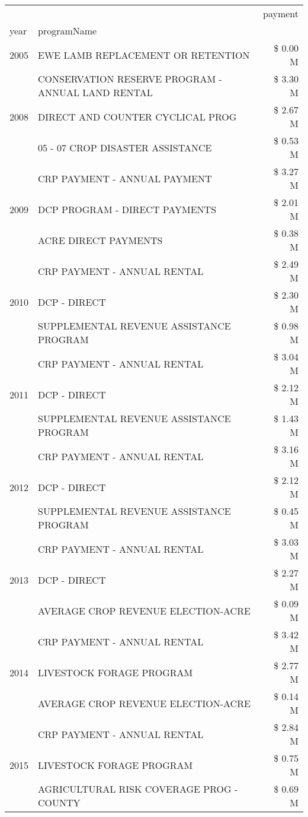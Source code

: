 \begin{tabular}{llr}
\toprule
 &  & payment \\
year & programName &  \\
\midrule
2005 & EWE LAMB REPLACEMENT OR RETENTION & \$ 0.00 M \\
\cline{1-3}
\multirow[t]{3}{*}{2008} & CONSERVATION RESERVE PROGRAM - ANNUAL LAND RENTAL & \$ 3.30 M \\
 & DIRECT AND COUNTER CYCLICAL PROG & \$ 2.67 M \\
 & 05 - 07 CROP DISASTER ASSISTANCE & \$ 0.53 M \\
\cline{1-3}
\multirow[t]{3}{*}{2009} & CRP PAYMENT - ANNUAL PAYMENT & \$ 3.27 M \\
 & DCP PROGRAM - DIRECT PAYMENTS & \$ 2.01 M \\
 & ACRE DIRECT PAYMENTS & \$ 0.38 M \\
\cline{1-3}
\multirow[t]{3}{*}{2010} & CRP PAYMENT - ANNUAL RENTAL & \$ 2.49 M \\
 & DCP - DIRECT & \$ 2.30 M \\
 & SUPPLEMENTAL REVENUE ASSISTANCE PROGRAM & \$ 0.98 M \\
\cline{1-3}
\multirow[t]{3}{*}{2011} & CRP PAYMENT - ANNUAL RENTAL & \$ 3.04 M \\
 & DCP - DIRECT & \$ 2.12 M \\
 & SUPPLEMENTAL REVENUE ASSISTANCE PROGRAM & \$ 1.43 M \\
\cline{1-3}
\multirow[t]{3}{*}{2012} & CRP PAYMENT - ANNUAL RENTAL & \$ 3.16 M \\
 & DCP - DIRECT & \$ 2.12 M \\
 & SUPPLEMENTAL REVENUE ASSISTANCE PROGRAM & \$ 0.45 M \\
\cline{1-3}
\multirow[t]{3}{*}{2013} & CRP PAYMENT - ANNUAL RENTAL & \$ 3.03 M \\
 & DCP - DIRECT & \$ 2.27 M \\
 & AVERAGE CROP REVENUE ELECTION-ACRE & \$ 0.09 M \\
\cline{1-3}
\multirow[t]{3}{*}{2014} & CRP PAYMENT - ANNUAL RENTAL & \$ 3.42 M \\
 & LIVESTOCK FORAGE PROGRAM & \$ 2.77 M \\
 & AVERAGE CROP REVENUE ELECTION-ACRE & \$ 0.14 M \\
\cline{1-3}
\multirow[t]{3}{*}{2015} & CRP PAYMENT - ANNUAL RENTAL & \$ 2.84 M \\
 & LIVESTOCK FORAGE PROGRAM & \$ 0.75 M \\
 & AGRICULTURAL RISK COVERAGE PROG - COUNTY & \$ 0.69 M \\

\end{tabular}
